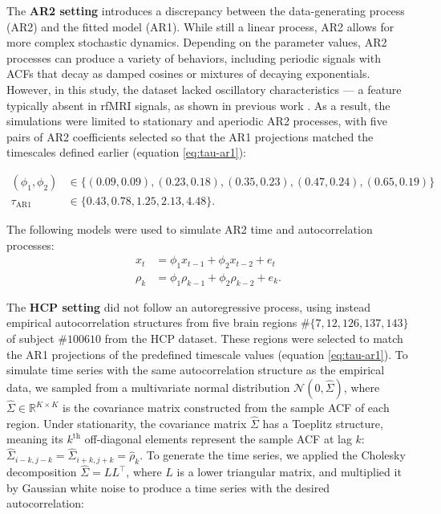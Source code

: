 \documentclass[main.tex]{subfiles}
\begin{document}
The \textbf{AR2 setting} introduces a discrepancy between the data-generating process (AR2) and the fitted model (AR1). While still a linear process, AR2 allows for more complex stochastic dynamics. Depending on the parameter values, AR2 processes can produce a variety of behaviors, including periodic signals with ACFs that decay as damped cosines or mixtures of decaying exponentials. However, in this study, the dataset lacked oscillatory characteristics --- a feature typically absent in rfMRI signals, as shown in previous work \citep{he_scale-free_2011}. As a result, the simulations were limited to stationary and aperiodic AR2 processes, with five pairs of AR2 coefficients selected so that the AR1 projections matched the timescales defined earlier (equation \eqref{eq:tau-ar1}):

\begin{align}
    (\phi_1, \phi_2) &\in \{(0.09, 0.09), (0.23, 0.18), (0.35, 0.23), (0.47, 0.24), (0.65, 0.19)\}\\
    \tau_\text{AR1} &\in \{0.43, 0.78, 1.25, 2.13, 4.48\}.
\end{align}

\noindent The following models were used to simulate AR2 time and autocorrelation processes:
\begin{align}
    x_t &= \phi_1 x_{t-1} + \phi_2 x_{t-2} + e_t\\
    \rho_k &= \phi_1 \rho_{k-1} + \phi_2 \rho_{k-2} + e_k.
\end{align}

The \textbf{HCP setting} did not follow an autoregressive process, using instead empirical autocorrelation structures from five brain regions $\# \{7, 12, 126, 137, 143\}$ of subject $\#100610$ from the HCP dataset. These regions were selected to match the AR1 projections of the predefined timescale values (equation \eqref{eq:tau-ar1}). To simulate time series with the same autocorrelation structure as the empirical data, we sampled from a multivariate normal distribution $\mathcal{N}(0, \hat\Sigma)$, where $\hat\Sigma \in \mathbb{R}^{K\times K}$ is the covariance matrix constructed from the sample ACF of each region. Under stationarity, the covariance matrix $\hat\Sigma$ has a Toeplitz structure, meaning its $k^\text{th}$ off-diagonal elements represent the sample ACF at lag $k$: $\hat\Sigma_{i-k, j-k} = \hat\Sigma_{i+k, j+k} = \hat\rho_k$. To generate the time series, we applied the Cholesky decomposition $\hat\Sigma = LL^{\top}$, where $L$ is a lower triangular matrix, and multiplied it by Gaussian white noise to produce a time series with the desired autocorrelation:
\end{document}
